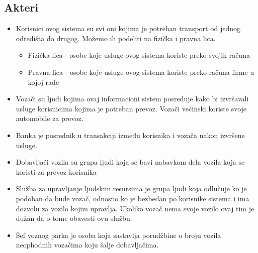 \subsection{\bfseries Akteri}
\begin{itemize}
    \item Korisnici ovog sistema su svi oni kojima je potreban transport od jednog odredišta do drugog. Možemo ih podeliti na fizička i pravna lica. 
    \begin{itemize}
        \item Fizička lica - osobe koje usluge ovog sistema koriste preko svojih računa
        \item Pravna lica - osobe koje usluge ovog sistema koriste preko računa firme u kojoj rade
    \end{itemize}
    \item Vozači su ljudi kojima ovaj informacioni sistem posreduje kako bi izvršavali usluge korisnicima kojima je potreban prevoz. Vozači većinski koriste svoje automobile za prevoz.
    \item Banka je posrednik u transakciji između korisnika i vozača nakon izvršene usluge.
    \item Dobavljači vozila su grupa ljudi koja se bavi nabavkom dela vozila koja se koristi za prevoz korisnika
    \item Služba za upravljanje ljudskim resursima je grupa ljudi koja odlučuje ko je podoban da bude vozač, odnosno ko je bezbedan po korisnike sistema i ima dozvolu za vozilo kojim upravlja. Ukoliko vozač nema svoje vozilo ovaj tim je dužan da o tome obavesti ovu službu.
     \item Šef voznog parka je osoba koja sastavlja porudžbine o broju vozila neophodnih vozačima koju šalje dobavljačima.
\end{itemize}